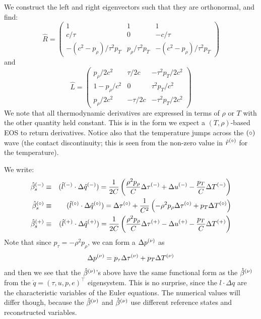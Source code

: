 We construct the left and right eigenvectors such that they are orthonormal,
and find:
\begin{equation}
\renewcommand{\arraystretch}{1.3}
\hat{R} = \left ( \begin{array}{ccc}
     1                       & 1                 & 1 \\
   c/\tau                    & 0                 & -c/\tau \\
  -(c^2 - p_\rho)/\tau^2 p_T & p_\rho/\tau^2 p_T & -(c^2 - p_\rho)/\tau^2 p_T
  \end{array} \right )
\end{equation}
and
\begin{equation}
\hat{L} = \left ( \begin{array}{ccc}
      {p_\rho}/{2 c^2}   & {\tau}/{2c}  & -{\tau^2 p_T}/{2 c^2} \\
      1 - {p_\rho}/{c^2} &0             & {\tau^2 p_T}/{c^2} \\
      {p_\rho}/{2 c^2}   & -{\tau}/{2c} & -{\tau^2 p_T}/{2 c^2} \end{array} \right )
\end{equation}
We note that all
thermodynamic derivatives are expressed in terms of $\rho$ or $T$ with
the other quantity held constant.  This is in the form we expect a
$(T, \rho)$-based EOS to return derivatives.  Notice also that the
temperature jumps across the ${(\circ)}$ wave (the contact discontinuity;
this is seen from the non-zero value in $\hat{r}^{(\circ)}$ for the
temperature).

We write:
\begin{eqnarray}
\hat{\beta}^\evm_s &\equiv& (\hat{l}^\evm \cdot \Delta \hat{q}^\evm ) =
   \frac{1}{2C} \left (\frac{\rho^2 p_\rho}{C} \Delta \tau^\evm
                        + \Delta u^\evm - \frac{p_T}{C}\Delta T^\evm \right ) \\
%
\hat{\beta}^\evz_s &\equiv& (\hat{l}^\evz \cdot \Delta \hat{q}^\evz ) =
    \Delta \tau^\evz +
        \frac{1}{C^2} \left (-\rho^2 p_\rho \Delta \tau^\evz
                        + {p_T}\Delta T^\evz \right ) \\
%
\hat{\beta}^\evp_s &\equiv& (\hat{l}^\evp \cdot \Delta \hat{q}^\evp ) =
   \frac{1}{2C} \left (\frac{\rho^2 p_\rho}{C} \Delta \tau^\evp
                        - \Delta u^\evp - \frac{p_T}{C}\Delta T^\evp \right )
\end{eqnarray}
Note that since $p_\tau = -\rho^2 p_\rho$, we can form a $\Delta p^{(\nu)}$ as
\begin{equation}
\Delta p^{(\nu)} = p_\tau \Delta \tau^{(\nu)} + p_T \Delta T^{(\nu)}
\end{equation}
and then we see that the $\hat{\beta}^{(\nu)}$'s above have the same
functional form as the $\mathring{\beta}^{(\nu)}$ from the $\mathring{q}
= (\tau, u, p, e)^\intercal$ eigensystem.  This is no surprise, since
the $l\cdot \Delta q$ are the characteristic variables of the Euler
equations.  The numerical values will differ though, because the
$\hat{\beta}^{(\nu)}$ and $\mathring{\beta}^{(\nu)}$ use different reference
states and reconstructed variables.

